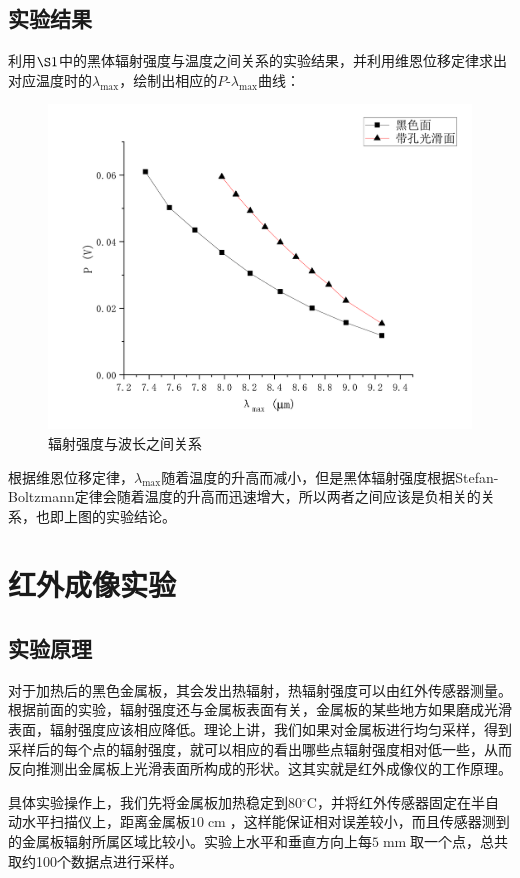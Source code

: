 \documentclass{WHUReport}
\begin{document}
\begin{multicols}{2}
	\subsection{实验结果}
	利用$\S 1$中的黑体辐射强度与温度之间关系的实验结果，并利用维恩位移定律求出对应温度时的$\lambda_{\max}$，绘制出相应的$P\mbox{-}\lambda_{\max}$曲线：
	\begin{figure}[H]
		\centering
		\includegraphics[width=\linewidth]{figs/P-lambda.pdf}
		\caption{辐射强度与波长之间关系}
	\end{figure}
	
	根据维恩位移定律，$\lambda_{\max}$随着温度的升高而减小，但是黑体辐射强度根据Stefan-Boltzmann定律会随着温度的升高而迅速增大，所以两者之间应该是负相关的关系，也即上图的实验结论。
	\section{红外成像实验}
	\subsection{实验原理}
	对于加热后的黑色金属板，其会发出热辐射，热辐射强度可以由红外传感器测量。根据前面的实验，辐射强度还与金属板表面有关，金属板的某些地方如果磨成光滑表面，辐射强度应该相应降低。理论上讲，我们如果对金属板进行均匀采样，得到采样后的每个点的辐射强度，就可以相应的看出哪些点辐射强度相对低一些，从而反向推测出金属板上光滑表面所构成的形状。这其实就是红外成像仪的工作原理。
	
	具体实验操作上，我们先将金属板加热稳定到$80\operatorname{^\circ C}$，并将红外传感器固定在半自动水平扫描仪上，距离金属板$10\operatorname{cm}$，这样能保证相对误差较小，而且传感器测到的金属板辐射所属区域比较小。实验上水平和垂直方向上每$5\operatorname{mm}$取一个点，总共取约100个数据点进行采样。

\end{multicols}
\end{document}
